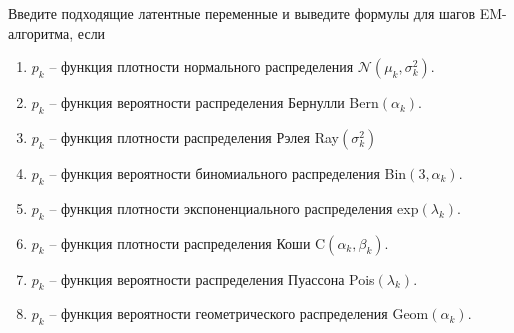 \documentclass[10pt, a4paper]{extarticle}
\begin{document}
	Введите подходящие латентные переменные и выведите формулы для шагов EM-алгоритма, если
	\begin{enumerate}[label = \alph*)]
		\item $p_k$ -- функция плотности нормального распределения $\mathcal{N}(\mu_k, \sigma^2_k)$.
		\item $p_k$ -- функция вероятности распределения Бернулли Bern$(\alpha_k)$.
		\item $p_k$ -- функция плотности распределения Рэлея Ray$(\sigma^2_k)$
		\item $p_k$ -- функция вероятности биномиального распределения Bin$(3, \alpha_k)$.
		\item $p_k$ -- функция плотности экспоненциального распределения exp$(\lambda_k)$.
		\item $p_k$ -- функция плотности распределения Коши C$(\alpha_k, \beta_k)$.
		\item $p_k$ -- функция вероятности распределения Пуассона Pois$(\lambda_k)$.
		\item $p_k$ -- функция вероятности геометрического распределения Geom$(\alpha_k)$.
	\end{enumerate}
	
	
\end{document}
